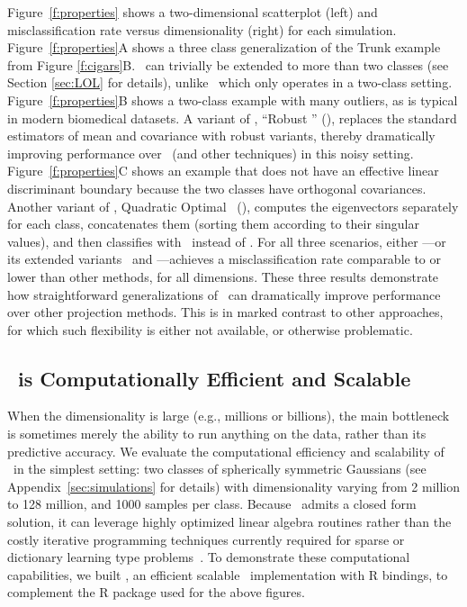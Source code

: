 \documentclass[11pt]{extarticle}
\begin{document}
Figure~\ref{f:properties} shows a two-dimensional scatterplot (left) and misclassification rate versus dimensionality (right) for each simulation. 
Figure~\ref{f:properties}{\color{magenta}A} shows a three class generalization of the  Trunk example from Figure \ref{f:cigars}{\color{magenta}B}.
\Lol~can trivially be extended to more than two classes (see Section \ref{sec:LOL} for details), unlike \Road~which only operates in a two-class setting.
% 
Figure~\ref{f:properties}{\color{magenta}B} shows a two-class example with many outliers, as is typical in modern biomedical datasets.  A variant of \Lol, ``Robust \Lol'' (\Rlol),
replaces the standard estimators of mean and covariance with robust variants, thereby dramatically improving performance over \Lol~(and other techniques) in this noisy setting.
%
Figure~\ref{f:properties}{\color{magenta}C} shows an example that does not have an effective linear discriminant boundary because the two classes have orthogonal  covariances.
Another variant of \Lol, Quadratic Optimal \Qda~(\Qoq),
computes the eigenvectors separately for each class, concatenates them (sorting them according to their singular values), and then classifies with \Qda~instead of \Lol. 
For all three scenarios, either \Lol---or its extended variants \Rlol~and \Qoq---achieves a misclassification rate  comparable to or lower  than other methods, for all dimensions. 
% 
These three results demonstrate how straightforward generalizations of \Lol~can dramatically improve performance over other projection methods. This is in marked contrast to other approaches, for which such flexibility is either not available, or otherwise problematic.





\subsection*{\Lol~is Computationally Efficient and Scalable}
\label{sec:speed}



When the dimensionality  is large (e.g., millions or billions), the main bottleneck  is sometimes merely the ability to run anything on the data, rather than its predictive accuracy.
%
We evaluate the computational efficiency and scalability of \Lol~in the simplest setting: two classes of spherically symmetric Gaussians (see Appendix~\ref{sec:simulations} for details) with dimensionality varying from 2 million to 128 million, and 1000 samples per class.
Because \Lol~admits a closed form solution, it can leverage highly optimized linear algebra routines rather than the costly iterative programming techniques currently required for sparse or dictionary learning type problems~\cite{Mairal2009}.
To demonstrate these computational capabilities, we built , an efficient scalable \Lol~implementation with R bindings, to complement the R package  used for the above figures.
\end{document}
